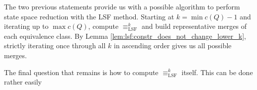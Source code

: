 The two previous statements provide us with a possible algorithm to perform state space reduction with the LSF method. Starting at $k = \min c(Q) - 1$ and iterating up to $\max c(Q)$, compute $\equiv_\text{LSF}^k$ and build representative merges of each equivalence class. By Lemma \ref{lem:lsf:constr_does_not_change_lower_k}, strictly iterating once through all $k$ in ascending order gives us all possible merges.

The final question that remains is how to compute $\equiv_\text{LSF}^k$ itself. This can be done rather easily 

















